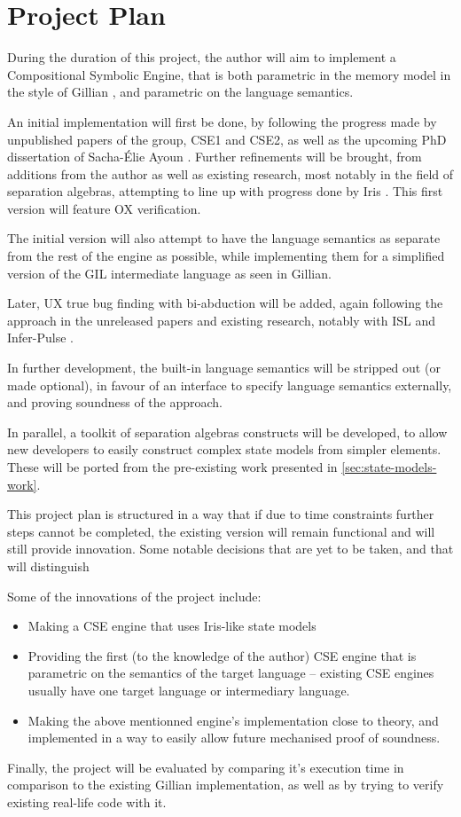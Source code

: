 \chapter{Project Plan}

During the duration of this project, the author will aim to implement a Compositional Symbolic Engine, that is both parametric in the memory model in the style of Gillian \cite{gillian0, gillian1, gillian2}, and parametric on the language semantics.

An initial implementation will first be done, by following the progress made by unpublished papers of the group, CSE1 \cite{cse1} and CSE2, as well as the upcoming PhD dissertation of Sacha-Élie Ayoun \cite{sacha-phd}. Further refinements will be brought, from additions from the author as well as existing research, most notably in the field of separation algebras, attempting to line up with progress done by Iris \cite{iris}. This first version will feature OX verification.

The initial version will also attempt to have the language semantics as separate from the rest of the engine as possible, while implementing them for a simplified version of the GIL intermediate language as seen in Gillian.

Later, UX true bug finding with bi-abduction will be added, again following the approach in the unreleased papers and existing research, notably with ISL \cite{isl} and Infer-Pulse \cite{pulse}.

In further development, the built-in language semantics will be stripped out (or made optional), in favour of an interface to specify language semantics externally, and proving soundness of the approach. 

In parallel, a toolkit of separation algebras constructs will be developed, to allow new developers to easily construct complex state models from simpler elements. These will be ported from the pre-existing work presented in \autoref{sec:state-models-work}.

This project plan is structured in a way that if due to time constraints further steps cannot be completed, the existing version will remain functional and will still provide innovation. Some notable decisions that are yet to be taken, and that will distinguish

Some of the innovations of the project include: \begin{itemize}
	\item Making a CSE engine that uses Iris-like state models
	\item Providing the first (to the knowledge of the author) CSE engine that is parametric on the semantics of the target language -- existing CSE engines usually have one target language or intermediary language.
	\item Making the above mentionned engine's implementation close to theory, and implemented in a way to easily allow future mechanised proof of soundness.
\end{itemize}

Finally, the project will be evaluated by comparing it's execution time in comparison to the existing Gillian implementation, as well as by trying to verify existing real-life code with it.